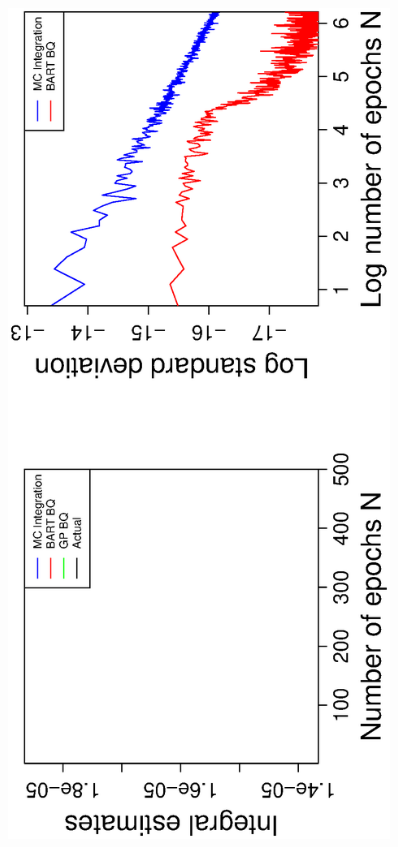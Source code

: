 \vspace{-0.5cm}
\begin{figure}[H]
  \centering
  \hspace{-1.6cm}
  \begin{minipage}[b]{0.4\textwidth}
    \includegraphics[width = 0.9\textwidth, angle = -90]{report/Figures/6/convergenceMean610Dimensions.eps}

\end{minipage}
\end{figure}
